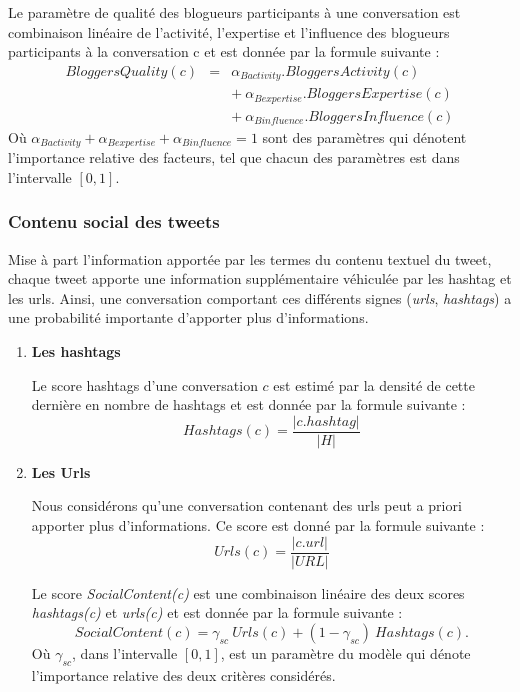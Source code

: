 \documentclass{article-hermes}
\begin{document}
\par Le paramètre de qualité des blogueurs participants à une  conversation est combinaison linéaire de l'activité, l'expertise et l'influence des blogueurs participants à la conversation c et est donnée par la formule suivante : 
\begin{eqnarray}
\label{eq:blogerquality}
BloggersQuality(c) &=& \alpha_{Bactivity}.BloggersActivity(c) \nonumber\\ 
&&  + ~ \alpha_{Bexpertise}.BloggersExpertise(c)\nonumber \\
&& + ~ \alpha_{Binfluence}.BloggersInfluence(c)
\end{eqnarray}
Où $\alpha_{Bactivity} + \alpha_{Bexpertise} +\alpha_{Binfluence} = 1$ sont des paramètres qui dénotent l'importance relative des facteurs, tel que chacun des paramètres est dans l'intervalle $[0,1]$.

\subsubsection{Contenu social des tweets}
\par  Mise à part l'information apportée par les termes du contenu textuel du tweet, chaque tweet apporte une information supplémentaire véhiculée par les hashtag et les urls. Ainsi, une conversation comportant ces différents signes (\textit{urls}, \textit{hashtags}) a une probabilité importante d'apporter plus d'informations.
\begin{enumerate}
\item \textbf{Les hashtags}
\par Le score hashtags d'une conversation $c$ est estimé par la densité de cette dernière en nombre de hashtags et est donnée par la formule suivante :
\begin{equation}
Hashtags(c) = \frac{|c.hashtag|}{|H|}
\end{equation}

\item \textbf{Les Urls}
\par Nous considérons qu'une conversation contenant des urls peut a priori apporter plus d'informations. Ce score est donné par la formule suivante : 
\begin{equation}
Urls(c) = \frac{|c.url|}{|URL|}
\end{equation}
\par Le score \textit{SocialContent(c)} est une combinaison linéaire  des deux scores \textit{hashtags(c)} et \textit{urls(c)} et est donnée par la formule suivante : 
\begin{equation}
SocialContent(c) = \gamma_{sc} ~ Urls(c) + (1-\gamma_{sc})~Hashtags(c).
\end{equation}
Où $\gamma_{sc}$, dans l'intervalle  $[0,1]$, est un paramètre du modèle qui dénote l'importance relative des deux critères considérés.
\end{enumerate}
\end{document}
